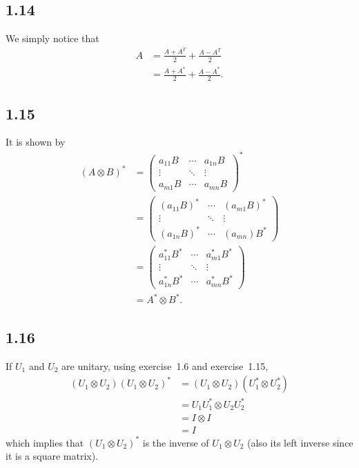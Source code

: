 \subsection*{1.14}
\begin{solution}
  We simply notice that
  \begin{align*}
    A & = \frac{A + A^T}{2} + \frac{A - A^T}{2}\\
      & = \frac{A + A^*}{2} + \frac{A - A^*}{2}.
  \end{align*}
\end{solution}

\subsection*{1.15}
\begin{solution}
  It is shown by
  \begin{align*}
    (A \otimes B)^*
    & =
    \begin{pmatrix}
      a_{11}B & \cdots & a_{1n}B\\
      \vdots  & \ddots & \vdots\\
      a_{m1}B & \cdots & a_{mn}B
    \end{pmatrix}^*\\
    & =
    \begin{pmatrix}
      (a_{11}B)^* & \cdots & (a_{m1}B)^*\\
      \vdots  & \ddots & \vdots\\
      (a_{1n}B)^* & \cdots & (a_{mn})B^*
    \end{pmatrix}\\
    & =
    \begin{pmatrix}
      a_{11}^*B^* & \cdots & a_{m1}^*B^*\\
      \vdots  & \ddots & \vdots\\
      a_{1n}^*B^* & \cdots & a_{mn}^*B^*
    \end{pmatrix}\\
    & =
    A^* \otimes B^*.
  \end{align*}
\end{solution}

\subsection*{1.16}
\begin{solution}
  If $U_1$ and $U_2$ are unitary,
  using exercise~1.6 and exercise~1.15,
  \begin{align*}
    (U_1 \otimes U_2) (U_1 \otimes U_2)^*
    & = (U_1 \otimes U_2) (U_1^* \otimes U_2^*)\\
    & = U_1U_1^* \otimes U_2U_2^*\\
    & = I \otimes I\\
    & = I
  \end{align*}
  which implies that $(U_1 \otimes U_2)^*$
  is the inverse of $U_1 \otimes U_2$
  (also its left inverse since it is a square matrix).
\end{solution}

